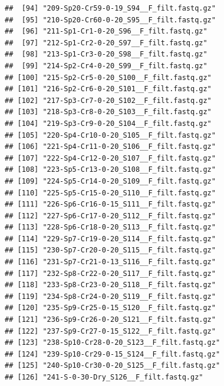 \documentclass[]{article}
\newenvironment{Shaded}{\begin{snugshade}}{\end{snugshade}}
\newcommand{\CommentTok}[1]{\textcolor[rgb]{0.56,0.35,0.01}{\textit{#1}}}
\newcommand{\KeywordTok}[1]{\textcolor[rgb]{0.13,0.29,0.53}{\textbf{#1}}}
\newcommand{\NormalTok}[1]{#1}
\newcommand{\StringTok}[1]{\textcolor[rgb]{0.31,0.60,0.02}{#1}}
\begin{document}
\begin{verbatim}
##  [94] "209-Sp20-Cr59-0-19_S94__F_filt.fastq.gz" 
##  [95] "210-Sp20-Cr60-0-20_S95__F_filt.fastq.gz" 
##  [96] "211-Sp1-Cr1-0-20_S96__F_filt.fastq.gz"   
##  [97] "212-Sp1-Cr2-0-20_S97__F_filt.fastq.gz"   
##  [98] "213-Sp1-Cr3-0-20_S98__F_filt.fastq.gz"   
##  [99] "214-Sp2-Cr4-0-20_S99__F_filt.fastq.gz"   
## [100] "215-Sp2-Cr5-0-20_S100__F_filt.fastq.gz"  
## [101] "216-Sp2-Cr6-0-20_S101__F_filt.fastq.gz"  
## [102] "217-Sp3-Cr7-0-20_S102__F_filt.fastq.gz"  
## [103] "218-Sp3-Cr8-0-20_S103__F_filt.fastq.gz"  
## [104] "219-Sp3-Cr9-0-20_S104__F_filt.fastq.gz"  
## [105] "220-Sp4-Cr10-0-20_S105__F_filt.fastq.gz" 
## [106] "221-Sp4-Cr11-0-20_S106__F_filt.fastq.gz" 
## [107] "222-Sp4-Cr12-0-20_S107__F_filt.fastq.gz" 
## [108] "223-Sp5-Cr13-0-20_S108__F_filt.fastq.gz" 
## [109] "224-Sp5-Cr14-0-20_S109__F_filt.fastq.gz" 
## [110] "225-Sp5-Cr15-0-20_S110__F_filt.fastq.gz" 
## [111] "226-Sp6-Cr16-0-15_S111__F_filt.fastq.gz" 
## [112] "227-Sp6-Cr17-0-20_S112__F_filt.fastq.gz" 
## [113] "228-Sp6-Cr18-0-20_S113__F_filt.fastq.gz" 
## [114] "229-Sp7-Cr19-0-20_S114__F_filt.fastq.gz" 
## [115] "230-Sp7-Cr20-0-20_S115__F_filt.fastq.gz" 
## [116] "231-Sp7-Cr21-0-13_S116__F_filt.fastq.gz" 
## [117] "232-Sp8-Cr22-0-20_S117__F_filt.fastq.gz" 
## [118] "233-Sp8-Cr23-0-20_S118__F_filt.fastq.gz" 
## [119] "234-Sp8-Cr24-0-20_S119__F_filt.fastq.gz" 
## [120] "235-Sp9-Cr25-0-15_S120__F_filt.fastq.gz" 
## [121] "236-Sp9-Cr26-0-20_S121__F_filt.fastq.gz" 
## [122] "237-Sp9-Cr27-0-15_S122__F_filt.fastq.gz" 
## [123] "238-Sp10-Cr28-0-20_S123__F_filt.fastq.gz"
## [124] "239-Sp10-Cr29-0-15_S124__F_filt.fastq.gz"
## [125] "240-Sp10-Cr30-0-20_S125__F_filt.fastq.gz"
## [126] "241-S-0-30-Dry_S126__F_filt.fastq.gz"
\end{verbatim}

\begin{Shaded}
\end{Shaded}
\end{document}
